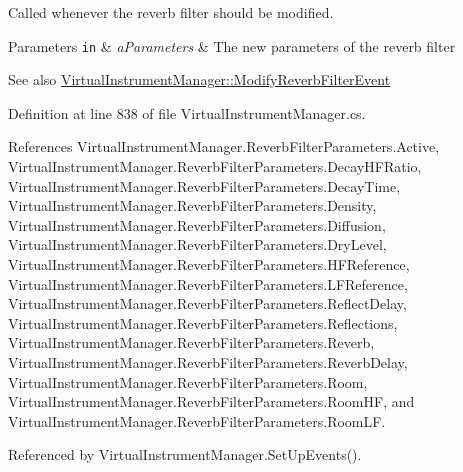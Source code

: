 Called whenever the reverb filter should be modified. 


\begin{DoxyParams}[1]{Parameters}
\mbox{\tt in}  & {\em a\+Parameters} & The new parameters of the reverb filter\\
\hline
\end{DoxyParams}
\begin{DoxySeeAlso}{See also}
\hyperlink{group___v_i_m_event_types_class_virtual_instrument_manager_1_1_modify_reverb_filter_event}{Virtual\+Instrument\+Manager\+::\+Modify\+Reverb\+Filter\+Event} 
\end{DoxySeeAlso}


Definition at line 838 of file Virtual\+Instrument\+Manager.\+cs.



References Virtual\+Instrument\+Manager.\+Reverb\+Filter\+Parameters.\+Active, Virtual\+Instrument\+Manager.\+Reverb\+Filter\+Parameters.\+Decay\+H\+F\+Ratio, Virtual\+Instrument\+Manager.\+Reverb\+Filter\+Parameters.\+Decay\+Time, Virtual\+Instrument\+Manager.\+Reverb\+Filter\+Parameters.\+Density, Virtual\+Instrument\+Manager.\+Reverb\+Filter\+Parameters.\+Diffusion, Virtual\+Instrument\+Manager.\+Reverb\+Filter\+Parameters.\+Dry\+Level, Virtual\+Instrument\+Manager.\+Reverb\+Filter\+Parameters.\+H\+F\+Reference, Virtual\+Instrument\+Manager.\+Reverb\+Filter\+Parameters.\+L\+F\+Reference, Virtual\+Instrument\+Manager.\+Reverb\+Filter\+Parameters.\+Reflect\+Delay, Virtual\+Instrument\+Manager.\+Reverb\+Filter\+Parameters.\+Reflections, Virtual\+Instrument\+Manager.\+Reverb\+Filter\+Parameters.\+Reverb, Virtual\+Instrument\+Manager.\+Reverb\+Filter\+Parameters.\+Reverb\+Delay, Virtual\+Instrument\+Manager.\+Reverb\+Filter\+Parameters.\+Room, Virtual\+Instrument\+Manager.\+Reverb\+Filter\+Parameters.\+Room\+HF, and Virtual\+Instrument\+Manager.\+Reverb\+Filter\+Parameters.\+Room\+LF.



Referenced by Virtual\+Instrument\+Manager.\+Set\+Up\+Events().


